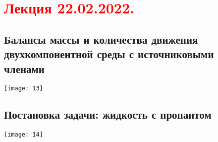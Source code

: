 \documentclass[main.tex]{subfiles}
\begin{document}
\section{\textcolor{red}{Лекция 22.02.2022.}}

\subsection{Балансы массы и количества движения двухкомпонентной среды с источниковыми членами}
\texttt{[image: 13]}

\subsection{Постановка задачи: жидкость с пропантом}
\texttt{[image: 14]}


\end{document}
